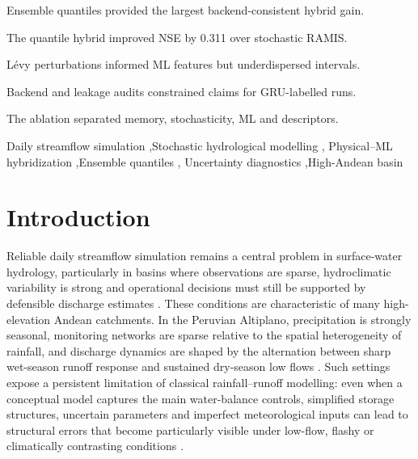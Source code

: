 \documentclass[a4paper,fleqn]{cas-sc}
\begin{document}
\begin{highlights}
\item Ensemble quantiles provided the largest backend-consistent hybrid gain.
\item The quantile hybrid improved NSE by 0.311 over stochastic RAMIS.
\item L\'{e}vy perturbations informed ML features but underdispersed intervals.
\item Backend and leakage audits constrained claims for GRU-labelled runs.
\item The ablation separated memory, stochasticity, ML and descriptors.
\end{highlights}

\begin{keywords}
Daily streamflow simulation \sep Stochastic hydrological modelling \sep
Physical--ML hybridization \sep Ensemble quantiles \sep
Uncertainty diagnostics \sep High-Andean basin
\end{keywords}

\maketitle

\section{Introduction}\label{sec:introduction}

Reliable daily streamflow simulation remains a central problem in surface-water hydrology, particularly in basins where observations are sparse, hydroclimatic variability is strong and operational decisions must still be supported by defensible discharge estimates
\citep{razavi2013streamflow,guo2021regionalization}. These conditions are characteristic of many high-elevation Andean catchments. In the Peruvian Altiplano, precipitation is strongly seasonal, monitoring networks are sparse relative to the spatial heterogeneity of rainfall,
and discharge dynamics are shaped by the alternation between sharp wet-season runoff response and sustained dry-season low flows \citep{condom2004transient, ubieta2018hydrological,lima2025modeling}. Such settings expose a persistent limitation of classical rainfall--runoff modelling: even when a conceptual model captures the main water-balance controls, simplified storage structures, uncertain parameters and imperfect meteorological inputs can lead to structural errors that become particularly visible under low-flow, flashy or climatically contrasting conditions \citep{van2013influence,nauditt2017conceptual,ragettli2014evaluation}.
\end{document}
